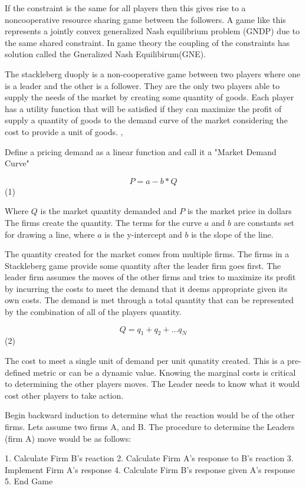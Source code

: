 \documentclass[phd, 12pt, print]{fauthesis}
\begin{document}
If the constraint is the same for all players then this gives rise to 
a noncooperative resource sharing game between the followers. A game like 
this represents a jointly convex generalized Nash equilibrium 
problem (GNDP) due to the same shared constraint. In game theory the 
coupling of the constraints has solution called the Gneralized Nash 
Equilibirum(GNE).\cite{Lefeng} 

The stackleberg duoply is a non-cooperative game between two players 
where one is a leader and the other is a follower. They are the only 
two players able to supply the needs of the market by creating some 
quantity of goods. Each player has a utility function that will be 
satisfied if they can maximize the profit of supply a quantity of 
goods to the demand curve of the market considering the cost to provide 
a unit of goods. \cite{Zhang} ,\cite{Tolwinski} 

Define a pricing demand as a linear function and call it a 
"Market Demand Curve"

$$ P = a  -  b * Q $$ (1)

Where $Q$ is the market quantity demanded and $P$ is the market price in dollars
The firms create the quantity. The terms for the curve $a$ and $b$ are constants 
set for drawing a line, where $a$ is the y-intercept and $b$ is the slope of the line.

The quantity created for the market comes from multiple firms. 
The firms in a Stackleberg game provide some quantity after the 
leader firm goes first. The leader firm assumes the moves of the 
other firms and tries to maximize its profit by incurring the costs 
to meet the demand that it deems appropriate given its own costs. 
The demand is met through a total quantity that can be represented 
by the combination of all of the players quantity. 

$$ Q = q_{1} + q_{2} + ... q_{N} $$ (2)

The cost to meet a single unit of demand per unit qunatity created. 
This is a pre-defined metric or can be a dynamic value. Knowing the 
marginal costs is critical to determining the other players moves. 
The Leader needs to know what it would cost other players to take action.

Begin backward induction to determine what the reaction would be of 
the other firms. Lets assume two firms A, and B. The procedure to 
determine the Leaders (firm A) move would be as follows:

1. Calculate Firm B's reaction
2. Calculate Firm A's response to B's reaction
3. Implement Firm A's response
4. Calculate Firm B's response given A's response
5. End Game
\end{document}
